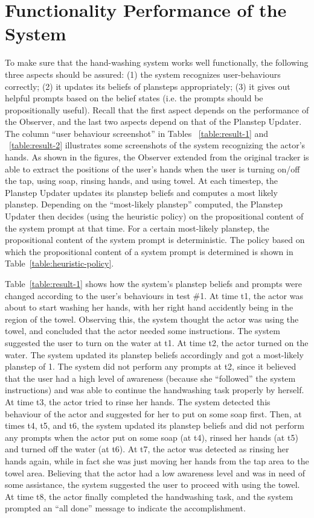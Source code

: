 \section{Functionality Performance of the System}

To make sure that the hand-washing system works well functionally, the following three aspects should be assured: (1) the system recognizes user-behaviours correctly; (2) it updates its beliefs of plansteps appropriately; (3) it gives out helpful prompts based on the belief states (i.e. the prompts should be propositionally useful). Recall that the first aspect depends on the performance of the Observer, and the last two aspects depend on that of the Planstep Updater. The column ``user behaviour screenshot'' in Tables ~\ref{table:result-1} and ~\ref{table:result-2} illustrates some screenshots of the system recognizing the actor's hands. As shown in the figures, the Observer extended from the original tracker is able to extract the positions of the user's hands when the user is turning on/off the tap, using soap, rinsing hands, and using towel. At each timestep, the Planstep Updater updates its planstep beliefs and computes a most likely planstep. Depending on the ``most-likely planstep'' computed, the Planstep Updater then decides (using the heuristic policy) on the propositional content of the system prompt at that time. For a certain most-likely planstep, the propositional content of the system prompt is deterministic. The policy based on which the propositional content of a system prompt is determined is shown in Table~\ref{table:heuristic-policy}.

Table~\ref{table:result-1} shows how the system's planstep beliefs and prompts were changed according to the user's behaviours in test \#1. At time t1, the actor was about to start washing her hands, with her right hand accidently being in the region of the towel. Observing this, the system thought the actor was using the towel, and concluded that the actor needed some instructions. The system suggested the user to turn on the water at t1. At time t2, the actor turned on the water. The system updated its planstep beliefs accordingly and got a most-likely planstep of 1. The system did not perform any prompts at t2, since it believed that the user had a high level of awareness (because she ``followed'' the system instructions) and was able to continue the handwashing task properly by herself. At time t3, the actor tried to rinse her hands. The system detected this behaviour of the actor and suggested for her to put on some soap first. Then, at times t4, t5, and t6, the system updated its planstep beliefs and did not perform any prompts when the actor put on some soap (at t4), rinsed her hands (at t5) and turned off the water (at t6). At t7, the actor was detected as rinsing her hands again, while in fact she was just moving her hands from the tap area to the towel area. Believing that the actor had a low awareness level and was in need of some assistance, the system suggested the user to proceed with using the towel. At time t8, the actor finally completed the handwashing task, and the system prompted an ``all done'' message to indicate the accomplishment.

